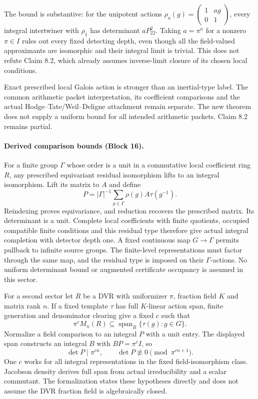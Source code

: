 \documentclass[11pt]{article}
\theoremstyle{definition}
\theoremstyle{remark}
\begin{document}
The bound is substantive: for the unipotent actions
$\rho_a(g)=\begin{pmatrix}1&ag\\0&1\end{pmatrix}$, every integral intertwiner
with $\rho_1$ has determinant $aP_{22}^2$. Taking $a=\pi^n$ for a nonzero
$\pi\in I$ rules out every
fixed detecting depth, even though all the field-valued approximants are
isomorphic and their integral limit is trivial. This does not refute Claim 8.2,
which already assumes inverse-limit closure of its chosen local conditions.

Exact prescribed local Galois action is stronger than an inertial-type label.
The common arithmetic packet interpretation, its coefficient comparisons and
the actual Hodge--Tate/Weil--Deligne attachment remain separate. The new theorem
does not supply a uniform bound for all intended arithmetic packets. Claim 8.2
remains partial.

\paragraph{Derived comparison bounds (Block 16).}
For a finite group $\Gamma$ whose order is a unit in a commutative local
coefficient ring $R$, any prescribed equivariant residual isomorphism lifts to
an integral isomorphism. Lift its matrix to $A$ and define
\[
P=|\Gamma|^{-1}\sum_{g\in\Gamma}\rho(g)A\tau(g^{-1}).
\]
Reindexing proves equivariance, and reduction recovers the prescribed matrix.
Its determinant is a unit. Complete local coefficients with finite quotients,
occupied compatible finite conditions and this residual type therefore give
actual integral completion with detector depth one. A fixed continuous map
$G\to\Gamma$ permits pullback to infinite source groups. The finite-level
representations must factor through the same map, and the residual type is
imposed on their $\Gamma$-actions. No uniform determinant bound or augmented
certificate occupancy is assumed in this sector.

For a second sector let $R$ be a DVR with uniformizer $\pi$, fraction field $K$
and matrix rank $n$. If a fixed template $\tau$ has full $K$-linear action span,
finite generation and denominator clearing give a fixed $c$ such that
\[
\pi^c M_n(R)\subseteq\operatorname{span}_R\{\tau(g):g\in G\}.
\]
Normalize a field comparison to an integral $P$ with a unit entry. The displayed
span constructs an integral $B$ with $BP=\pi^cI$, so
\[
\det P\mid\pi^{cn},\qquad \det P\not\equiv0\pmod{\pi^{cn+1}}.
\]
One $c$ works for all integral representations in the fixed field-isomorphism
class. Jacobson density derives full span from actual irreducibility and a
scalar commutant. The formalization states these hypotheses directly and does
not assume the DVR fraction field is algebraically closed.
\end{document}

